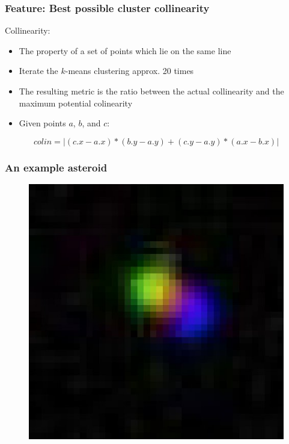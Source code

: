 \documentclass{beamer}
\begin{document}
\begin{frame}
    \frametitle{Feature: Best possible cluster collinearity}
    Collinearity:
    \begin{itemize}
        \item The property of a set of points which lie on the same line
        \item Iterate the $k$-means clustering approx. 20 times
        \item The resulting metric is the ratio between the actual collinearity
        and the maximum potential colinearity
        \item Given points $a$, $b$, and $c$:
    \end{itemize}

        \begin{equation*}
            colin = | (c.x - a.x) * (b.y - a.y) + (c.y - a.y) * (a.x - b.x) |
        \end{equation*}
\end{frame}

\begin{frame}
    \frametitle{An example asteroid}
    \begin{figure}
        \centering
        \includegraphics[height=0.8\paperheight]{18364_large.jpg}
    \end{figure}
\end{frame}
\end{document}
